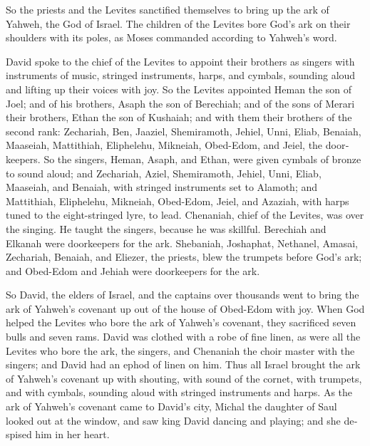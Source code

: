 \begin{paracol}{2}
\begin{otherlanguage}{english}
 So the priests and the Levites sanctified themselves to
bring up the ark of Yahweh, the God of Israel.  The
children of the Levites bore God's ark on their shoulders with its
poles, as Moses commanded according to Yahweh's word.

 David spoke to the chief of the Levites to appoint their
brothers as singers with instruments of music, stringed instruments,
harps, and cymbals, sounding aloud and lifting up their voices with joy.
 So the Levites appointed Heman the son of Joel; and of
his brothers, Asaph the son of Berechiah; and of the sons of Merari
their brothers, Ethan the son of Kushaiah;  and with them
their brothers of the second rank: Zechariah, Ben, Jaaziel, Shemiramoth,
Jehiel, Unni, Eliab, Benaiah, Maaseiah, Mattithiah, Eliphelehu,
Mikneiah, Obed-Edom, and Jeiel, the doorkeepers.  So the
singers, Heman, Asaph, and Ethan, were given cymbals of bronze to sound
aloud;  and Zechariah, Aziel, Shemiramoth, Jehiel, Unni,
Eliab, Maaseiah, and Benaiah, with stringed instruments set to Alamoth;
 and Mattithiah, Eliphelehu, Mikneiah, Obed-Edom, Jeiel,
and Azaziah, with harps tuned to the eight-stringed lyre, to lead.
 Chenaniah, chief of the Levites, was over the singing.
He taught the singers, because he was skillful. 
Berechiah and Elkanah were doorkeepers for the ark. 
Shebaniah, Joshaphat, Nethanel, Amasai, Zechariah, Benaiah, and Eliezer,
the priests, blew the trumpets before God's ark; and Obed-Edom and
Jehiah were doorkeepers for the ark.

 So David, the elders of Israel, and the captains over
thousands went to bring the ark of Yahweh's covenant up out of the house
of Obed-Edom with joy.  When God helped the Levites who
bore the ark of Yahweh's covenant, they sacrificed seven bulls and seven
rams.  David was clothed with a robe of fine linen, as
were all the Levites who bore the ark, the singers, and Chenaniah the
choir master with the singers; and David had an ephod of linen on him.
 Thus all Israel brought the ark of Yahweh's covenant up
with shouting, with sound of the cornet, with trumpets, and with
cymbals, sounding aloud with stringed instruments and harps.
 As the ark of Yahweh's covenant came to David's city,
Michal the daughter of Saul looked out at the window, and saw king David
dancing and playing; and she despised him in her heart.


\end{otherlanguage}
\end{paracol}
